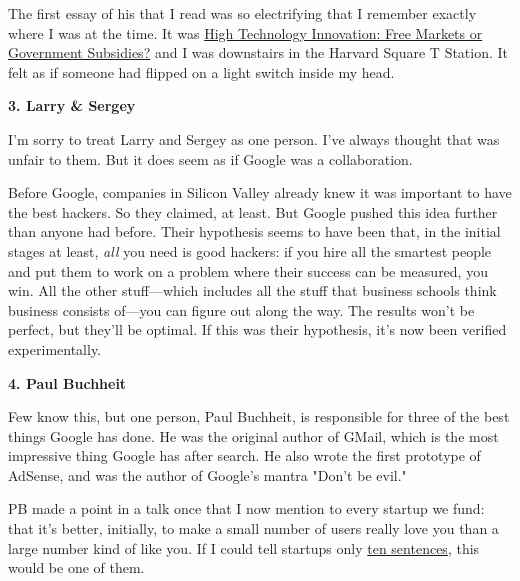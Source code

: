 The first essay of
                  his that I read was so electrifying that I remember exactly
                  where I was at the time. It was
                  \href{http://www.cypress.com/?rID=34993}{High Technology Innovation: Free Markets or Government
                    Subsidies?}
                  and I was downstairs in the Harvard Square T Station. It felt
                  as if someone had flipped on a light switch inside my head.

\textbf{3. Larry \& Sergey}

I'm sorry to treat Larry and Sergey as one
                  person. I've always thought that was unfair to them. But it
                  does seem as if Google was a collaboration.

Before
                  Google, companies in Silicon Valley already knew it was
                  important to have the best hackers. So they claimed, at least.
                  But Google pushed this idea further than anyone had before.
                  Their hypothesis seems to have been that, in the initial
                  stages at least, \emph{all} you need is good hackers: if you
                  hire all the smartest people and put them to work on a problem
                  where their success can be measured, you win. All the other
                  stuff---which includes all the stuff that business schools
                  think business consists of---you can figure out along the
                  way. The results won't be perfect, but they'll be optimal. If
                  this was their hypothesis, it's now been verified
                  experimentally.

\textbf{4. Paul Buchheit}

Few know this, but one person, Paul Buchheit, is
                  responsible for three of the best things Google has done. He
                  was the original author of GMail, which is the most impressive
                  thing Google has after search. He also wrote the first
                  prototype of AdSense, and was the author of Google's mantra
                  "Don't be evil."

PB made a point in a talk once
                  that I now mention to every startup we fund: that it's better,
                  initially, to make a small number of users really love you
                  than a large number kind of like you. If I could tell startups
                  only \href{http://www.paulgraham.com/13sentences.html}{ten sentences}, this would
                  be one of them.

